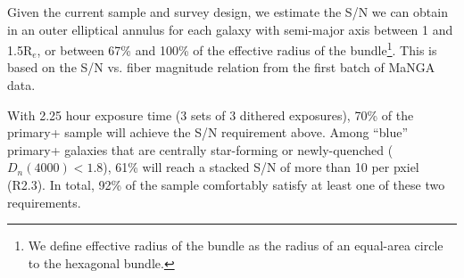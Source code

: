 \documentclass[preprint,11pt]{aastex}
\newcommand{\Hbeta}{{H$\beta$}}
\newcommand{\Reff}{{R$_{e}$}}
\begin{document}

Given the current sample and survey design, we estimate the S/N we can obtain in an outer elliptical annulus for each galaxy with
semi-major axis between 1 and 1.5\Reff, or between 67\% and 100\% of the effective radius of the bundle\footnote{We define
  effective radius of the bundle as the radius of an equal-area circle to the hexagonal bundle.}. This is based on the S/N
vs. fiber magnitude relation from the first batch of MaNGA data.

With 2.25 hour exposure time (3 sets of 3 dithered exposures), 70\% of the primary+ sample will achieve the S/N requirement
above. Among ``blue'' primary+ galaxies that are centrally star-forming or newly-quenched ($D_n(4000) < 1.8$), 61\% will reach a
stacked S/N of more than 10 per pxiel (R2.3).  In total, 92\% of the sample comfortably satisfy at least one of these two
requirements.



\end{document}
